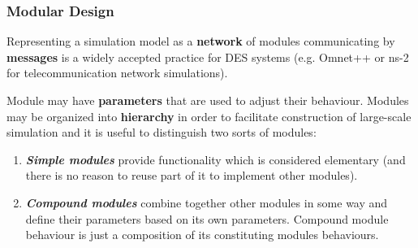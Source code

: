 \documentclass{beamer}
\begin{document}
\begin{frame}
\frametitle{Modular Design}
Representing a simulation model as a \textbf{network} of modules communicating by \textbf{messages} is a widely accepted practice for DES systems (e.g. Omnet++ or ns-2 for telecommunication network simulations).

Module may have \textbf{parameters} that are used to adjust their behaviour. Modules may be organized into \textbf{hierarchy} in order to facilitate construction of large-scale simulation and it is useful to distinguish two sorts of modules:
\begin{enumerate}
\item \textbf{\textit{Simple modules}} provide functionality which is considered elementary (and there is no reason to reuse part of it to implement other modules).

\item \textbf{\textit{Compound modules}} combine together other modules in some way and define their parameters based on its own parameters. Compound module behaviour is just a composition of its constituting modules behaviours.
\end{enumerate}
\end{frame}
\end{document}
